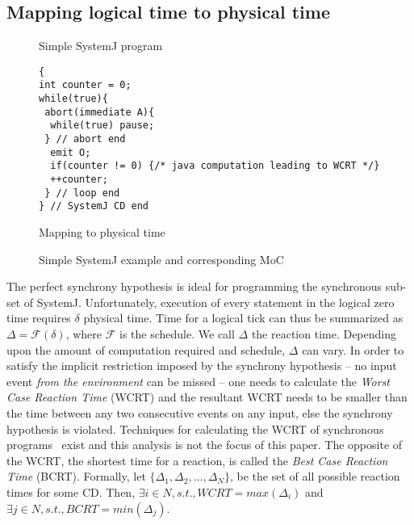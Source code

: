 \subsection{Mapping logical time to physical time}
\label{sec:mapping-logical-time}

\begin{figure}[t!]
\centering
\begin{SubFloat}{\label{fig:2a}Simple SystemJ program}%
\begin{minipage}[b]{1\linewidth}%
		\begin{lstlisting}[style=sysj,morekeywords={abort,await,emit,present,trap,pause,exit,delay,suspend}]
{
int counter = 0;
while(true){
 abort(immediate A){
  while(true) pause; 
 } // abort end
  emit O;
  if(counter != 0) {/* java computation leading to WCRT */}
  ++counter;
 } // loop end
} // SystemJ CD end
\end{lstlisting}%
\end{minipage}%
\end{SubFloat}

\begin{SubFloat}{\label{fig:2c}Mapping to physical time}%
\scalebox{0.68}{}
\end{SubFloat}%
\caption{Simple SystemJ example and corresponding MoC}
\label{fig:2}
\end{figure}

The perfect synchrony hypothesis is ideal for programming the
synchronous sub-set of SystemJ. Unfortunately, execution of every
statement in the logical zero time requires $\delta$ physical time. Time
for a logical tick can thus be summarized as $\Delta = \mathcal{F}
(\delta)$, where $\mathcal{F}$ is the schedule. We call $\Delta$ the
reaction time. Depending upon the amount of computation required and
schedule, $\Delta$ can vary. In order to satisfy the implicit
restriction imposed by the synchrony hypothesis -- no input event
\textit{from the environment} can be missed -- one needs to calculate
the \textit{Worst Case Reaction Time} (WCRT) and the resultant WCRT
needs to be smaller than the time between any two consecutive events on
any input, else the synchrony hypothesis is violated. Techniques for
calculating the WCRT of synchronous programs~\cite{boldt07} exist and
this analysis is not the focus of this paper. The opposite of the WCRT,
the shortest time for a reaction, is called the \textit{Best Case
  Reaction Time} (BCRT). Formally, let $\{\Delta_1, \Delta_2,\ldots,
\Delta_N\}$, be the set of all possible reaction times for some
CD. Then, $\exists i \in N, s.t., WCRT= max (\Delta_i)$ and $\exists j
\in N, s.t., BCRT = min (\Delta_j)$.


